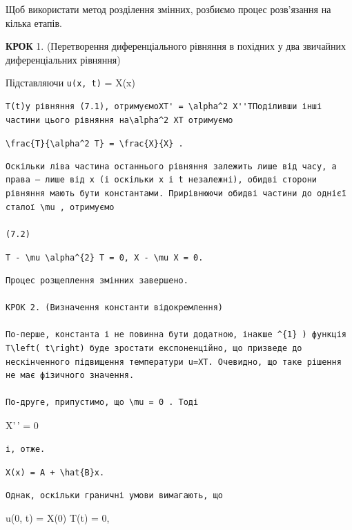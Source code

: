 \documentclass[
  ukrainian,
]{article}
\begin{document}
Щоб використати метод розділення змінних, розбиємо процес розв'язання на
кілька етапів.

\textbf{КРОК} 1. (Перетворення диференціального рівняння в похідних у
два звичайних диференціальних рівняння)

Підставляючи \texttt{u(x,\ t)} = X(x)

\begin{verbatim}
T(t)у рівняння (7.1), отримуємоXT' = \alpha^2 X''TПоділивши інші частини цього рівняння на\alpha^2 XT отримуємо
\end{verbatim}

\texttt{\textbackslash{}frac\{T\textquotesingle{}\}\{\textbackslash{}alpha\^{}2\ T\}\ =\ \textbackslash{}frac\{X\textquotesingle{}\textquotesingle{}\}\{X\}\ .}

\begin{verbatim}
Оскільки ліва частина останнього рівняння залежить лише від часу, а права — лише від x (і оскільки x і t незалежні), обидві сторони рівняння мають бути константами. Прирівнюючи обидві частини до однієї сталої \mu , отримуємо

(7.2)
\end{verbatim}

\texttt{T\textquotesingle{}\ -\ \textbackslash{}mu\ \textbackslash{}alpha\^{}\{2\}\ T\ =\ 0,\ X\textquotesingle{}\textquotesingle{}\ -\ \textbackslash{}mu\ X\ =\ 0.}

\begin{verbatim}
Процес розщеплення змінних завершено.

КРОК 2. (Визначення константи відокремлення)

По-перше, константа і не повинна бути додатною, інакше ^{1} ) функція T\left( t\right) буде зростати експоненційно, що призведе до нескінченного підвищення температури u=XT. Очевидно, що таке рішення не має фізичного значення.

По-друге, припустимо, що \mu = 0 . Тоді
\end{verbatim}

X'\,' = 0

\begin{verbatim}
і, отже.
\end{verbatim}

\texttt{X(x)\ =\ A\ +\ \textbackslash{}hat\{B\}x.}

\begin{verbatim}
Однак, оскільки граничні умови вимагають, що
\end{verbatim}

u(0, t) = X(0) T(t) = 0,
\end{document}
